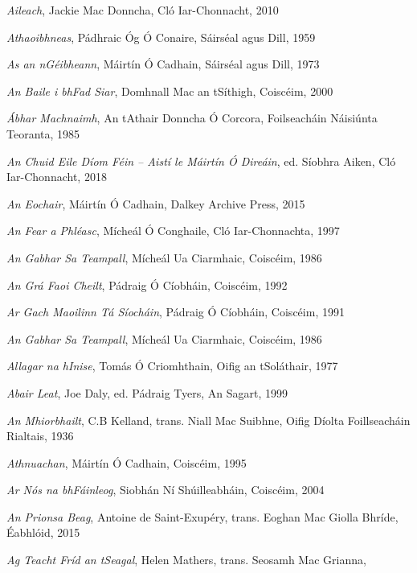 \documentclass[output=paper,colorlinks,citecolor=brown]{langscibook}
\begin{document}
\begin{description}[leftmargin=!,labelwidth=\widthof{\textsc{agmts:}},font=\normalfont\scshape,noitemsep]
\sloppy
\item[a:]  \textit{Aileach}, Jackie Mac Donncha, Cló Iar-Chonnacht, 2010 
\item[aa:]  \textit{Athaoibhneas}, Pádhraic Óg Ó Conaire, Sáirséal agus Dill, 1959 
\item[aag:]  \textit{As an nGéibheann}, Máirtín Ó Cadhain, Sáirséal agus Dill, 1973 
\item[abfs:]  \textit{An Baile i bhFad Siar}, Domhnall Mac an tSíthigh, Coiscéim, 2000  
\item[abhm:]  \textit{Ábhar Machnaimh}, An tAthair Donncha Ó Corcora, Foilseacháin Náisiúnta 
                    Teoranta, 1985
\item[aced:]  \textit{An Chuid Eile Díom Féin -- Aistí le Máirtín Ó Direáin}, ed. Síobhra Aiken, Cló 
                    Iar-Chonnacht, 2018
\item[ae:]  \textit{An Eochair}, Máirtín Ó Cadhain, Dalkey Archive Press, 2015
\item[afap:]  \textit{An Fear a Phléasc}, Mícheál Ó Conghaile,  Cló Iar-Chonnachta, 1997
\item[ag:]  \textit{An Gabhar Sa Teampall},  Mícheál Ua Ciarmhaic, Coiscéim, 1986 
\item[agfc:]  \textit{An Grá Faoi Cheilt}, Pádraig Ó Cíobháin, Coiscéim, 1992  
\item[agmts:]  \textit{Ar Gach Maoilinn Tá Síocháin}, Pádraig Ó Cíobháin, Coiscéim, 1991
\item[ag:]  \textit{An Gabhar Sa Teampall},  Mícheál Ua Ciarmhaic, Coiscéim, 1986
\item[ai:]  \textit{Allagar na hInise},  Tomás Ó Criomhthain, Oifig an tSoláthair, 1977
\item[al:]  \textit{Abair Leat}, Joe Daly, ed. Pádraig Tyers, An Sagart, 1999
\item[am:]  \textit{An Mhiorbhailt},  C.B Kelland, trans. Niall Mac Suibhne,  Oifig Díolta
                    Foillseacháin Rialtais, 1936 
\item[an:]  \textit{Athnuachan}, Máirtín Ó Cadhain, Coiscéim, 1995
\item[annf:]  \textit{Ar Nós na bhFáinleog}, Siobhán Ní Shúilleabháin, Coiscéim, 2004
\item[apb:]  \textit{An Prionsa Beag}, Antoine de Saint-Exupéry, trans. Eoghan Mac Giolla Bhríde, 
                    Éabhlóid, 2015
\item[atfs:]  \textit{Ag Teacht Fríd an tSeagal}, Helen Mathers, trans. Seosamh Mac Grianna,

\end{description}
\end{document}
